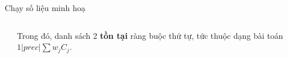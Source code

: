 \documentclass[10pt]{beamer}
\begin{document}
\begin{frame}{Chạy số liệu minh hoạ}
\begin{columns}
\begin{column}{0.5\textwidth}
    \begin{table}[ht]
        \centering
        \caption{Danh sách 2.}
        \label{tab:extended_job_table}
    \end{table}
\end{column}
\begin{column}{0.5\textwidth}
Trong đó, danh sách 2 \textbf{tồn tại} ràng buộc thứ tự, tức thuộc dạng bài toán $1|prec|\sum w_j C_j$.
\end{column}
\end{columns}
\end{frame}
\end{document}
